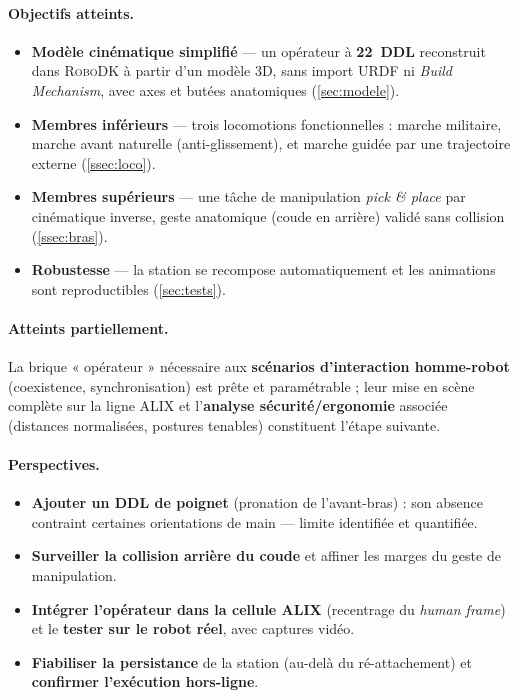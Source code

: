 \documentclass[12pt]{article}
\begin{document}
\paragraph{Objectifs atteints.}
\begin{itemize}[noitemsep]
  \item \textbf{Modèle cinématique simplifié} --- un opérateur à \textbf{22~DDL}
        reconstruit dans \textsc{RoboDK} à partir d'un modèle 3D, sans import URDF
        ni \emph{Build Mechanism}, avec axes et butées anatomiques
        (\cref{sec:modele}).
  \item \textbf{Membres inférieurs} --- trois locomotions fonctionnelles : marche
        militaire, marche avant naturelle (anti-glissement), et marche guidée par
        une trajectoire externe (\cref{ssec:loco}).
  \item \textbf{Membres supérieurs} --- une tâche de manipulation \emph{pick \&
        place} par cinématique inverse, geste anatomique (coude en arrière) validé
        sans collision (\cref{ssec:bras}).
  \item \textbf{Robustesse} --- la station se recompose automatiquement et les
        animations sont reproductibles (\cref{sec:tests}).
\end{itemize}

\paragraph{Atteints partiellement.} La brique « opérateur » nécessaire aux
\textbf{scénarios d'interaction homme-robot} (coexistence, synchronisation) est
prête et paramétrable ; leur mise en scène complète sur la ligne ALIX et
l'\textbf{analyse sécurité/ergonomie} associée (distances normalisées, postures
tenables) constituent l'étape suivante.

\paragraph{Perspectives.}
\begin{itemize}[noitemsep]
  \item \textbf{Ajouter un DDL de poignet} (pronation de l'avant-bras) : son
        absence contraint certaines orientations de main --- limite identifiée et
        quantifiée.
  \item \textbf{Surveiller la collision arrière du coude} et affiner les marges du
        geste de manipulation.
  \item \textbf{Intégrer l'opérateur dans la cellule ALIX} (recentrage du
        \emph{human frame}) et le \textbf{tester sur le robot réel}, avec captures
        vidéo.
  \item \textbf{Fiabiliser la persistance} de la station (au-delà du
        ré-attachement) et \textbf{confirmer l'exécution hors-ligne}.
\end{itemize}
\end{document}
